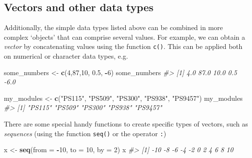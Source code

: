 \documentclass[
]{book}
\newenvironment{Shaded}{\begin{snugshade}}{\end{snugshade}}
\newcommand{\AttributeTok}[1]{\textcolor[rgb]{0.13,0.29,0.53}{#1}}
\newcommand{\CommentTok}[1]{\textcolor[rgb]{0.56,0.35,0.01}{\textit{#1}}}
\newcommand{\DecValTok}[1]{\textcolor[rgb]{0.00,0.00,0.81}{#1}}
\newcommand{\FloatTok}[1]{\textcolor[rgb]{0.00,0.00,0.81}{#1}}
\newcommand{\FunctionTok}[1]{\textcolor[rgb]{0.13,0.29,0.53}{\textbf{#1}}}
\newcommand{\NormalTok}[1]{#1}
\newcommand{\OtherTok}[1]{\textcolor[rgb]{0.56,0.35,0.01}{#1}}
\newcommand{\SpecialCharTok}[1]{\textcolor[rgb]{0.81,0.36,0.00}{\textbf{#1}}}
\newcommand{\StringTok}[1]{\textcolor[rgb]{0.31,0.60,0.02}{#1}}
\begin{document}
\subsection{Vectors and other data types}\label{vectors-and-other-data-types}

Additionally, the simple data types listed above can be combined in more complex `objects' that can comprise several values. For example, we can obtain a \emph{vector} by concatenating values using the function \texttt{c()}. This can be applied both on numerical or character data types, e.g.~

\begin{Shaded}
\begin{Highlighting}[]
\NormalTok{some\_numbers }\OtherTok{\textless{}{-}} \FunctionTok{c}\NormalTok{(}\DecValTok{4}\NormalTok{,}\DecValTok{87}\NormalTok{,}\DecValTok{10}\NormalTok{, }\FloatTok{0.5}\NormalTok{, }\SpecialCharTok{{-}}\DecValTok{6}\NormalTok{)}
\NormalTok{some\_numbers}
\CommentTok{\#\textgreater{} [1]  4.0 87.0 10.0  0.5 {-}6.0}
\end{Highlighting}
\end{Shaded}

\begin{Shaded}
\begin{Highlighting}[]

\NormalTok{my\_modules }\OtherTok{\textless{}{-}} \FunctionTok{c}\NormalTok{(}\StringTok{"PS115"}\NormalTok{, }\StringTok{"PS509"}\NormalTok{, }\StringTok{"PS300"}\NormalTok{, }\StringTok{"PS938"}\NormalTok{, }\StringTok{"PS9457"}\NormalTok{)}
\NormalTok{my\_modules}
\CommentTok{\#\textgreater{} [1] "PS115"  "PS509"  "PS300"  "PS938"  "PS9457"}
\end{Highlighting}
\end{Shaded}

There are some special handy functions to create specific types of vectors, such as \emph{sequences} (using the function \texttt{seq()} or the operator \texttt{:})

\begin{Shaded}
\begin{Highlighting}[]
\NormalTok{x }\OtherTok{\textless{}{-}} \FunctionTok{seq}\NormalTok{(}\AttributeTok{from =} \SpecialCharTok{{-}}\DecValTok{10}\NormalTok{, }\AttributeTok{to =} \DecValTok{10}\NormalTok{, }\AttributeTok{by =} \DecValTok{2}\NormalTok{)}
\NormalTok{x}
\CommentTok{\#\textgreater{}  [1] {-}10  {-}8  {-}6  {-}4  {-}2   0   2   4   6   8  10}
\end{Highlighting}
\end{Shaded}
\end{document}
